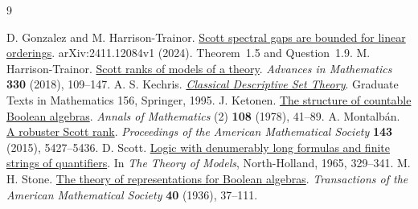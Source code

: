 \documentclass[11pt,letterpaper]{article}
\theoremstyle{definition}\newtheorem{definition}[theorem]{Definition}
\begin{document}
\begin{thebibliography}{9}
 D. Gonzalez and M. Harrison-Trainor.
\href{https://arxiv.org/html/2411.12084v1}{Scott spectral gaps are bounded for linear orderings}.
arXiv:2411.12084v1 (2024). Theorem~1.5 and Question~1.9.
 M. Harrison-Trainor.
\href{https://doi.org/10.1016/j.aim.2018.03.012}{Scott ranks of models of a theory}.
\emph{Advances in Mathematics} \textbf{330} (2018), 109--147.
 A. S. Kechris.
\href{https://doi.org/10.1007/978-1-4612-4190-4}{\emph{Classical Descriptive Set Theory}}.
Graduate Texts in Mathematics 156, Springer, 1995.
 J. Ketonen.
\href{https://annals.math.princeton.edu/1978/108-1/p02}{The structure of countable Boolean algebras}.
\emph{Annals of Mathematics} (2) \textbf{108} (1978), 41--89.
 A. Montalb\'an.
\href{https://doi.org/10.1090/proc/12669}{A robuster Scott rank}.
\emph{Proceedings of the American Mathematical Society} \textbf{143} (2015), 5427--5436.
 D. Scott.
\href{https://doi.org/10.1016/B978-0-7204-2233-7.50036-8}{Logic with denumerably long formulas and finite strings of quantifiers}.
In \emph{The Theory of Models}, North-Holland, 1965, 329--341.
 M. H. Stone.
\href{https://doi.org/10.1090/S0002-9947-1936-1501865-8}{The theory of representations for Boolean algebras}.
\emph{Transactions of the American Mathematical Society} \textbf{40} (1936), 37--111.
\end{thebibliography}
\end{document}
